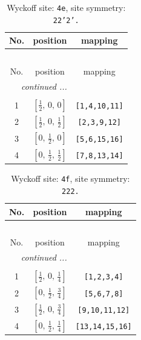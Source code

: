 \documentclass[fleqn,8pt]{jsarticle}
\begin{document}
\begin{longtable}{ccc}
\caption{Wyckoff site: {\tt 4e}, site symmetry: {\tt 22'2'.}}
 \\
 \hline \hline
No. & position & mapping \\ \hline \endfirsthead

\multicolumn{2}{l}{\tablename\ \thetable{}} \\
 \hline \hline
No. & position & mapping \\ \hline \endhead

 \hline \hline
\multicolumn{2}{r}{\footnotesize\it continued ...} \\ \endfoot

 \hline \hline
\multicolumn{2}{r}{} \\ \endlastfoot

1 & $\left[ \frac{1}{2},\, 0,\, 0 \right]$ & {\tt [1,4,10,11]} \\ \hline
2 & $\left[ \frac{1}{2},\, 0,\, \frac{1}{2} \right]$ & {\tt [2,3,9,12]} \\ \hline
3 & $\left[ 0,\, \frac{1}{2},\, 0 \right]$ & {\tt [5,6,15,16]} \\ \hline
4 & $\left[ 0,\, \frac{1}{2},\, \frac{1}{2} \right]$ & {\tt [7,8,13,14]} \\
\end{longtable}
\renewcommand{\arraystretch}{1.2}
\begin{longtable}{ccc}
\caption{Wyckoff site: {\tt 4f}, site symmetry: {\tt 222.}}
 \\
 \hline \hline
No. & position & mapping \\ \hline \endfirsthead

\multicolumn{2}{l}{\tablename\ \thetable{}} \\
 \hline \hline
No. & position & mapping \\ \hline \endhead

 \hline \hline
\multicolumn{2}{r}{\footnotesize\it continued ...} \\ \endfoot

 \hline \hline
\multicolumn{2}{r}{} \\ \endlastfoot

1 & $\left[ \frac{1}{2},\, 0,\, \frac{1}{4} \right]$ & {\tt [1,2,3,4]} \\ \hline
2 & $\left[ 0,\, \frac{1}{2},\, \frac{3}{4} \right]$ & {\tt [5,6,7,8]} \\ \hline
3 & $\left[ \frac{1}{2},\, 0,\, \frac{3}{4} \right]$ & {\tt [9,10,11,12]} \\ \hline
4 & $\left[ 0,\, \frac{1}{2},\, \frac{1}{4} \right]$ & {\tt [13,14,15,16]} \\
\end{longtable}
\end{document}

